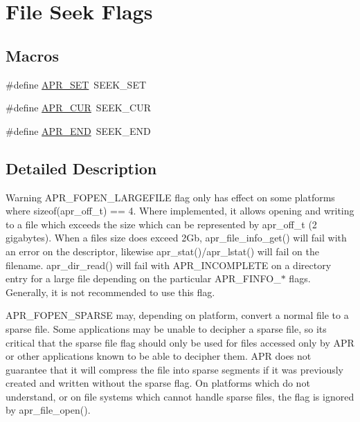 \hypertarget{group__apr__file__seek__flags}{}\section{File Seek Flags}
\label{group__apr__file__seek__flags}
\subsection*{Macros}
\begin{DoxyCompactItemize}
\item 
\#define \mbox{\hyperlink{group__apr__file__seek__flags_ga2fdf78845c897f69451d49e1e2b90ac9}{A\+P\+R\+\_\+\+S\+ET}}~S\+E\+E\+K\+\_\+\+S\+ET
\item 
\#define \mbox{\hyperlink{group__apr__file__seek__flags_gae17abc53fea00bfd51e184017113e250}{A\+P\+R\+\_\+\+C\+UR}}~S\+E\+E\+K\+\_\+\+C\+UR
\item 
\#define \mbox{\hyperlink{group__apr__file__seek__flags_ga438f3568be799d1e4bbd19492ca47d22}{A\+P\+R\+\_\+\+E\+ND}}~S\+E\+E\+K\+\_\+\+E\+ND
\end{DoxyCompactItemize}


\subsection{Detailed Description}
\begin{DoxyWarning}{Warning}
A\+P\+R\+\_\+\+F\+O\+P\+E\+N\+\_\+\+L\+A\+R\+G\+E\+F\+I\+LE flag only has effect on some platforms where sizeof(apr\+\_\+off\+\_\+t) == 4. Where implemented, it allows opening and writing to a file which exceeds the size which can be represented by apr\+\_\+off\+\_\+t (2 gigabytes). When a file\textquotesingle{}s size does exceed 2\+Gb, apr\+\_\+file\+\_\+info\+\_\+get() will fail with an error on the descriptor, likewise apr\+\_\+stat()/apr\+\_\+lstat() will fail on the filename. apr\+\_\+dir\+\_\+read() will fail with A\+P\+R\+\_\+\+I\+N\+C\+O\+M\+P\+L\+E\+TE on a directory entry for a large file depending on the particular A\+P\+R\+\_\+\+F\+I\+N\+F\+O\+\_\+$\ast$ flags. Generally, it is not recommended to use this flag.

A\+P\+R\+\_\+\+F\+O\+P\+E\+N\+\_\+\+S\+P\+A\+R\+SE may, depending on platform, convert a normal file to a sparse file. Some applications may be unable to decipher a sparse file, so it\textquotesingle{}s critical that the sparse file flag should only be used for files accessed only by A\+PR or other applications known to be able to decipher them. A\+PR does not guarantee that it will compress the file into sparse segments if it was previously created and written without the sparse flag. On platforms which do not understand, or on file systems which cannot handle sparse files, the flag is ignored by apr\+\_\+file\+\_\+open(). 
\end{DoxyWarning}


